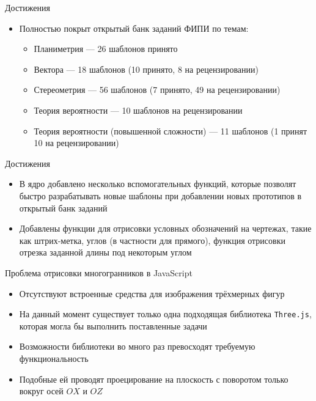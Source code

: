\documentclass[aspectratio=169,12pt]{beamer}
\begin{document}
\begin{frame}{Достижения}
	\begin{itemize}
		\item Полностью покрыт открытый банк заданий ФИПИ по темам:
		      \begin{itemize}
			      \item Планиметрия — 26 шаблонов принято
			      \item Вектора — 18 шаблонов (10 принято, 8 на рецензировании)
			      \item Стереометрия — 56 шаблонов (7 принято, 49 на рецензировании)
			      \item Теория вероятности — 10 шаблонов на рецензировании
			      \item Теория вероятности (повышенной сложности) — 11 шаблонов (1 принят 10 на рецензировании)
		      \end{itemize}
	\end{itemize}
\end{frame}

\begin{frame}{Достижения}
	\begin{itemize}
		\item В ядро добавлено несколько вспомогательных функций, которые позволят быстро разрабатывать новые шаблоны при добавлении новых прототипов в открытый банк заданий
		\item Добавлены функции для отрисовки условных обозначений на чертежах, такие как штрих-метка, углов (в частности для прямого), функция отрисовки отрезка заданной длины под некоторым углом
	\end{itemize}
\end{frame}

\begin{frame}{Проблема отрисовки многогранников в JavaScript}
	\begin{itemize}
		\item Отсутствуют встроенные средства для изображения трёхмерных фигур
		\item На данный момент существует только одна подходящая библиотека \texttt{Three.js}, которая могла бы выполнить поставленные задачи
		\item Возможности библиотеки во много раз превосходят требуемую функциональность
		\item Подобные ей проводят проецирование на плоскость с поворотом только вокруг осей $OX$ и $OZ$
	\end{itemize}
\end{frame}
\end{document}
